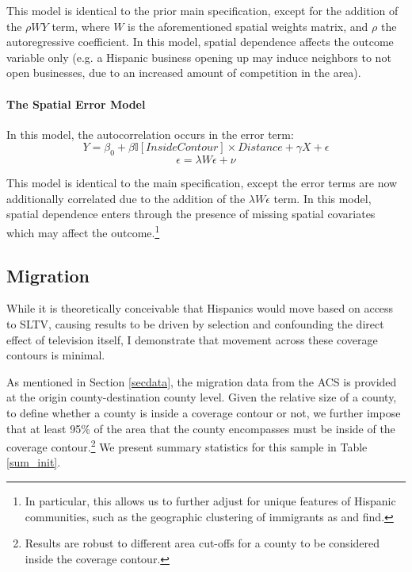 \documentclass[11pt]{article}
\begin{document}
This model is identical to the prior main specification, except for the addition of the $\rho W Y$ term, where $W$ is the aforementioned spatial weights matrix, and $\rho$ the autoregressive coefficient. In this model, spatial dependence affects the outcome variable only (e.g. a Hispanic business opening up may induce neighbors to not open businesses, due to an increased amount of competition in the area).

\paragraph{The Spatial Error Model}

In this model, the autocorrelation occurs in the error term:
\[ Y = \beta_0 + \beta \mathbb{I}[InsideContour] \times Distance + \gamma X + \epsilon \]
\[\epsilon = \lambda W \epsilon + \nu\]

This model is identical to the main specification, except the error terms are now additionally correlated due to the addition of the $\lambda W \epsilon$ term. In this model, spatial dependence enters through  the presence of missing spatial covariates which may affect the outcome.\footnote{ In particular, this allows us to further adjust for unique features of Hispanic communities, such as the geographic clustering of immigrants as \cite{cutler_when_2008} and \cite{cascio_cracks_2012} find.}

\subsection{Migration}

While it is theoretically conceivable that Hispanics would move based on access to SLTV, causing results to be driven by selection and confounding the direct effect of television itself, I demonstrate that movement across these coverage contours is minimal.

As mentioned in Section \ref{secdata}, the migration data from the ACS is provided at the origin county-destination county level. Given the relative size of a county, to define whether a county is inside a coverage contour or not, we further impose that at least 95\% of the area that the county encompasses must be inside of the coverage contour.\footnote{ Results are robust to different area cut-offs for a county to be considered inside the coverage contour.} We present summary statistics for this sample in Table \ref{sum_init}.
\end{document}
